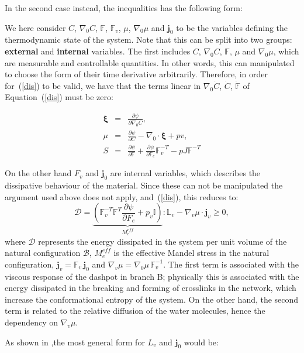 \documentclass[12pt]{extarticle}
\newcommand{\F}{\ensuremath{\mathbb{F}}}
\newcommand{\LL}{\ensuremath{\mathbb{L}}}
\begin{document}
In the second case instead, the inequalities has the following form:

We here consider $C$, $\nabla_0 C$, $\F$, $\F_v$, $\mu$, $\nabla_0 \mu$ and $\mathbf{j}_0$ to be the variables defining the thermodynamic state of the system. Note that this can be split into two groups: \textbf{external} and \textbf{internal} variables. The first includes $C$, $\nabla_0 C$, $\F$,  $\mu$ and $\nabla_0 \mu$, which are measurable and controllable quantities. In other words, this can manipulated to choose the form of their time derivative arbitrarily. Therefore, in order for~(\ref{dis}) to be valid, we have that the terms linear in $\nabla_0 \dot{C}$, $\dot{C}$, $\dot{\F}$ of Equation~(\ref{dis}) must be zero:

\begin{eqnarray}
	\mathbf{\xi}&=&\frac{\partial \psi}{\partial \nabla_0 C},\\
	\mu &=& \frac{\partial \psi}{\partial C} - \nabla_0\cdot\boldsymbol{\xi}+ p v,\\
	S &=& \frac{\partial \psi}{\partial \F} + \frac{\partial \psi}{\partial \F_e}\F_v^{-T}- p J \F^{-T}
\end{eqnarray}

On the other hand $F_v$ and $\mathbf{j}_0$ are internal variables, which describes the dissipative behaviour of the material. Since these can not be manipulated the argument used above does not apply, and~(\ref{dis}), this reduces to:
\begin{equation}
\mathcal{D}=\underbrace{\left(\F_v^{-T}\F^{T} \frac{\partial \psi}{\partial F_e}+p_v \mathbb{I}\right)}_{ M^{eff}_e}:\LL_v - \nabla_v \mu \cdot \mathbf{j}_v \geq 0,
\end{equation}
where $\mathcal{D}$ represents the energy dissipated in the system per unit volume of the natural configuration $\mathcal{B}$, $M^{eff}_e$ is the effective Mandel stress in the natural configuration, $\mathbf{j}_v = \F_v \,\mathbf{j}_0$ and $\nabla_v \mu= \nabla_0 \mu\, \F_v^{-1}$.
The first term is associated with the viscous response of the dashpot in branch B; physically this is associated with the energy dissipated in the breaking and forming of crosslinks in the network, which increase the conformational entropy of the system. On the other hand, the second term is related to the relative diffusion of the water molecules, hence the dependency on $\nabla_v \mu$. 

As shown in \cite{Article2},the most general form for $L_v$ and $\mathbf{j}_0$ would be:
\end{document}
